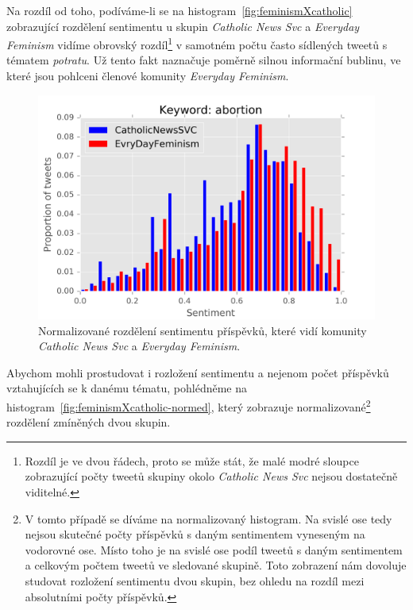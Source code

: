 \documentclass[12pt, a4paper]{article}
\numberwithin{equation}{section} 	%
\begin{document}
Na rozdíl od toho, podíváme-li se na histogram~\autoref{fig:feminismXcatholic} zobrazující rozdělení sentimentu u skupin \textit{Catholic News Svc} a \textit{Everyday Feminism} vidíme obrovský rozdíl\footnote{Rozdíl je ve dvou řádech, proto se může stát, že malé modré sloupce zobrazující počty tweetů skupiny okolo \textit{Catholic News Svc} nejsou dostatečně viditelné.} v samotném počtu často sídlených tweetů s tématem \textit{potratu}. Už tento fakt naznačuje poměrně silnou informační bublinu, ve které jsou pohlceni členové komunity \textit{Everyday Feminism}.
\begin{figure}[h]
\centering
\includegraphics[scale=0.5]{./Pics/feminismXcatholic-normed.png}
\caption{Normalizované rozdělení sentimentu příspěvků, které vidí komunity \textit{Catholic News Svc} a \textit{Everyday Feminism}.}
\label{fig:feminismXcatholic-normed}
\end{figure}
Abychom mohli prostudovat i rozložení sentimentu a nejenom počet příspěvků vztahujících se k danému tématu, pohlédněme na histogram~\autoref{fig:feminismXcatholic-normed}, který zobrazuje normalizované\footnote{V tomto případě se díváme na normalizovaný histogram. Na svislé ose tedy nejsou skutečné počty příspěvků s daným sentimentem vyneseným na vodorovné ose. Místo toho je na svislé ose podíl tweetů s daným sentimentem a celkovým počtem tweetů ve sledované skupině. Toto zobrazení nám dovoluje studovat rozložení sentimentu dvou skupin, bez ohledu na rozdíl mezi absolutními počty příspěvků.} rozdělení zmíněných dvou skupin.
\end{document}
